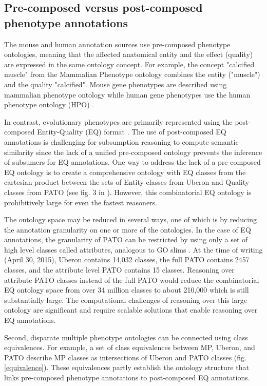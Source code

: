 \documentclass{article}
\begin{document}
\subsection{Pre-composed versus post-composed phenotype annotations}
The mouse and human annotation sources use pre-composed phenotype ontologies, meaning that the affected anatomical entity and the effect (quality) are expressed in the same ontology concept. For example, the concept "calcified muscle" from the Mammalian Phenotype ontology \cite{smith2012mammalian} combines the entity ("muscle") and the quality "calcified". Mouse gene phenotypes are described using mammalian phenotype ontology \cite{smith2012mammalian} while human gene phenotypes use the human phenotype ontology (HPO) \cite{kohler2013human}. 

In contrast, evolutionary phenotypes are primarily represented using the post-composed Entity-Quality (EQ) format \cite{mungall2010integrating}. The use of post-composed EQ annotations is challenging for subsumption reasoning to compute semantic similarity since the lack of a unified pre-composed ontology prevents the inference of subsumers for EQ annotations.  One way to address the lack of a pre-composed EQ ontology is to create a comprehensive ontology with EQ classes from the cartesian product between the sets of Entity classes from Uberon and Quality classes from PATO (see fig. 3 in \cite{washington2009linking}). However, this combinatorial EQ ontology is prohibitively large for even the fastest reasoners.  

The ontology space may be reduced in several ways, one of which is by reducing the annotation granularity on one or more of the ontologies. In the case of EQ annotations, the granularity of PATO can be restricted by using only a set of high level classes called attributes, analogous to GO slims \cite{gene2004gene}. At the time of writing (April 30, 2015), Uberon contains 14,032 classes, the full PATO contains 2457 classes, and the attribute level PATO contains 15 classes. Reasoning over attribute PATO classes instead of the full PATO would reduce the combinatorial EQ ontology space from over 34 million classes to about 210,000 which is still substantially large. The computational challenges of reasoning over this large ontology are significant and require scalable solutions that enable reasoning over EQ annotations.  

Second, disparate multiple phenotype ontologies can be connected using class equivalences. For example, a set of class equivalences between MP, Uberon, and PATO describe MP classes as intersections of Uberon and PATO classes (fig. \ref{equivalence}). These equivalences partly establish the ontology structure that links pre-composed phenotype annotations to post-composed EQ annotations.  
\end{document}

